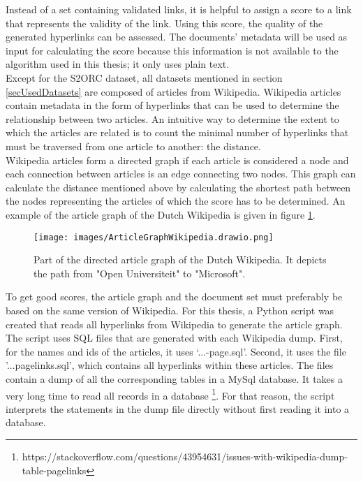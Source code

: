 Instead of a set containing validated links, it is helpful to assign a score to a link that represents the validity of the link. Using this score, the quality of the generated hyperlinks can be assessed. The documents' metadata will be used as input for calculating the score because this information is not available to the algorithm used in this thesis; it only uses plain text.\\
Except for the S2ORC dataset, all datasets mentioned in section \ref{secUsedDatasets} are composed of articles from Wikipedia. Wikipedia articles contain metadata in the form of hyperlinks that can be used to determine the relationship between two articles. An intuitive way to determine the extent to which the articles are related is to count the minimal number of hyperlinks that must be traversed from one article to another: the distance. \\
Wikipedia articles form a directed graph if each article is considered a node and each connection between articles is an edge connecting two nodes. This graph can calculate the distance mentioned above by calculating the shortest path between the nodes representing the articles of which the score has to be determined. An example of the article graph of the Dutch Wikipedia is given in figure \ref{imgArticleGraph}.\\

\begin{figure}[h]
\texttt{[image: images/ArticleGraphWikipedia.drawio.png]}
\caption{Part of the directed article graph of the Dutch Wikipedia. It depicts the path from "Open Universiteit" to "Microsoft".}
\label{imgArticleGraph}
\end{figure}


To get good scores, the article graph and the document set must preferably be based on the same version of Wikipedia. For this thesis, a Python script was created that reads all hyperlinks from Wikipedia to generate the article graph. The script uses SQL files that are generated with each Wikipedia dump. First, for the names and ids of the articles, it uses `...-page.sql'. Second,  it uses the file '...pagelinks.sql', which contains all hyperlinks within these articles. The files contain a dump of all the corresponding tables in a MySql database. It takes a very long time to read all records in a database \footnote{https://stackoverflow.com/questions/43954631/issues-with-wikipedia-dump-table-pagelinks}. For that reason, the script interprets the statements in the dump file directly without first reading it into a database.\\

